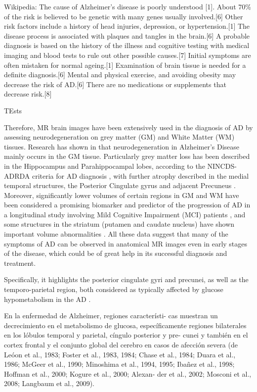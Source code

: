 Wikipedia: The cause of Alzheimer's disease is poorly understood [1]. About 70\% of the risk is believed to be genetic with many genes usually involved.[6] Other risk factors include a history of head injuries, depression, or hypertension.[1] The disease process is associated with plaques and tangles in the brain.[6] A probable diagnosis is based on the history of the illness and cognitive testing with medical imaging and blood tests to rule out other possible causes.[7] Initial symptoms are often mistaken for normal ageing.[1] Examination of brain tissue is needed for a definite diagnosis.[6] Mental and physical exercise, and avoiding obesity may decrease the risk of AD.[6] There are no medications or supplements that decrease risk.[8]

TEsts

Therefore, MR brain images have been extensively used in the diagnosis of AD by assessing neurodegeneration on grey matter (GM) and White Matter (WM) tissues. Research has shown in \cite{Baron2001,Misra2009,Pievani2013,Dubois2007} that neurodegeneration in Alzheimer's Disease mainly occurs in the GM tissue. Particularly grey matter loss has been described in the Hippocampus and Parahippocampal lobes, according to the NINCDS-ADRDA criteria for AD diagnosis \cite{Dubois2007}, with further atrophy described in the medial temporal structures, the Posterior Cingulate gyrus and adjacent Precuneus \cite{Baron2001}. Moreover, significantly lower volumes of certain regions in GM and WM have been considered a promising biomarker and predictor of the progression of AD in a longitudinal study involving Mild Cognitive Impairment (MCI) patients \cite{Misra2009}, and some structures in the striatum (putamen and caudate nucleus) have shown important volume abnormalities \cite{Pievani2013}. All these data suggest that many of the symptoms of AD can be observed in anatomical MR images even in early stages of the disease, which could be of great help in its successful diagnosis and treatment. 

Specifically, it highlights the posterior cingulate gyri and precunei, as well as the temporo-parietal region, both considered as typically affected by glucose hypometabolism in the AD \cite{Claus1994}.

En la enfermedad de Alzheimer, regiones característi-
cas muestran un decrecimiento en el metabolismo de glucosa, específicamente
regiones bilaterales en los lóbulos temporal y parietal, cíngulo posterior y pre-
cunei y también en el cortex frontal y el conjunto global del cerebro en casos
de afección severa (de Leóon et al., 1983; Foster et al., 1983, 1984; Chase et
al., 1984; Duara et al., 1986; McGeer et al., 1990; Minoshima et al., 1994,
1995; Ibañez et al., 1998; Hoffman et al., 2000; Kogure et al., 2000; Alexan-
der et al., 2002; Mosconi et al., 2008; Langbaum et al., 2009).


